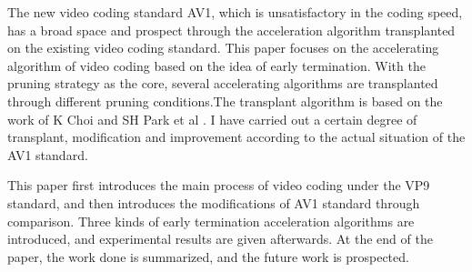 
\begin{eabstract}

  The new video coding standard AV1, which is unsatisfactory in the coding speed, has a broad space 
  and prospect through the acceleration algorithm transplanted on the existing video coding standard.
  This paper focuses on the accelerating algorithm of video coding based on the idea of early termination. 
  With the pruning strategy as the core, several accelerating algorithms are transplanted through 
  different pruning conditions.The transplant algorithm is based on the work of K Choi and 
  SH Park et al \cite{choi2011coding}. I have carried out a certain degree of transplant, 
  modification and improvement according to the actual situation of the AV1 standard.
  
  This paper first introduces the main process of video coding under the VP9 standard, and then 
  introduces the modifications of AV1 standard through comparison. Three kinds of early termination 
  acceleration algorithms are introduced, and experimental results are given afterwards. 
  At the end of the paper, the work done is summarized, and the future work is prospected.

\end{eabstract}

